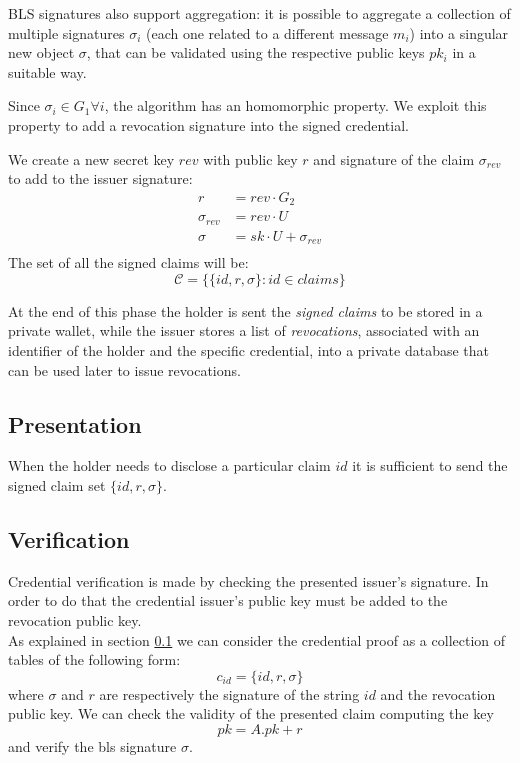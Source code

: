 BLS signatures also support aggregation: it is possible to aggregate a
collection of multiple signatures $\sigma_i$ (each one related to a
different message $m_i$) into a singular new object $\sigma$, that can
be validated using the respective public keys $pk_i$ in a suitable
way.

Since $\sigma_i\in G_1 \forall i$, the algorithm has an homomorphic
property. We exploit this property to add a revocation signature into
the signed credential.

We create a new secret key $rev$ with public key $r$ and signature of
the claim $\sigma_{rev}$ to add to the issuer signature:
\begin{equation*}\label{rev_agg}
    \begin{split}
        r &= rev \cdot G_2 \\
        \sigma_{rev} &= rev \cdot U\\
        \sigma &= sk\cdot U + \sigma_{rev}\\
   \end{split}
\end{equation*}
The set of all the signed claims will be:
\begin{equation*}
   \mathcal{C} = \big\{ \{id, r, \sigma \} : id\in claims  \big\}
\end{equation*}

At the end of this phase the holder is sent the \textit{signed claims}
to be stored in a private wallet, while the issuer stores a list of
\textit{revocations}, associated with an identifier of the holder and
the specific credential, into a private database that can be used
later to issue revocations.



\subsection{Presentation} \label{presentation}

When the holder needs to disclose a particular claim $id$ it is
sufficient to send the signed claim set $\{id, r, \sigma \}$.

\subsection{Verification}

Credential verification is made by checking the presented issuer's
signature. In order to do that the credential issuer's public key must
be added to the revocation public key.\\ As explained in section
\ref{presentation} we can consider the credential proof as a
collection of tables of the following form:
\begin{equation*}
    c_{id} = \{id, r, \sigma \}
\end{equation*}
where $\sigma$ and $r$ are respectively the signature of the string
$id$ and the revocation public key.  We can check the validity of the
presented claim computing the key
\begin{equation*}
    pk = A.pk + r
\end{equation*}
and verify the bls signature $\sigma$.

